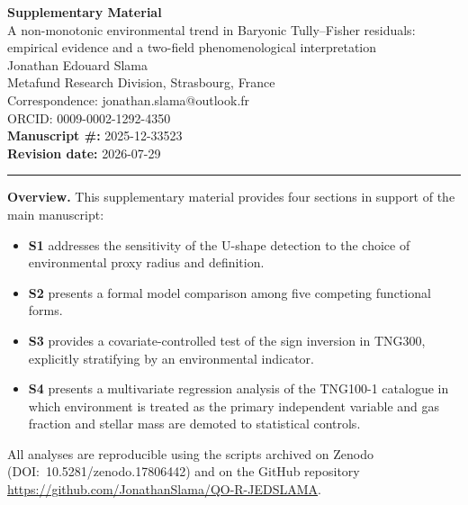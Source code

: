 \documentclass[11pt,a4paper]{article}
\begin{document}
\begin{center}
{\LARGE \textbf{Supplementary Material}}\\[0.3cm]

{\large A non-monotonic environmental trend in Baryonic Tully--Fisher residuals: empirical evidence and a two-field phenomenological interpretation}\\[0.3cm]

{Jonathan Edouard Slama}\\[0.2cm]

{\small Metafund Research Division, Strasbourg, France}\\
{\small Correspondence: jonathan.slama@outlook.fr}\\
{\small ORCID: 0009-0002-1292-4350}\\[0.3cm]

\textbf{Manuscript \#:} 2025-12-33523\\
\textbf{Revision date:} 2026-07-29
\end{center}

\vspace{0.5cm}



\hrule
\vspace{0.5cm}

\textbf{Overview.} This supplementary material provides four sections in
support of the main manuscript:

\begin{itemize}
    \item \textbf{S1} addresses the sensitivity of the U-shape detection
    to the choice of environmental proxy radius and definition.
    \item \textbf{S2} presents a formal model comparison among five
    competing functional forms.
    \item \textbf{S3} provides a covariate-controlled test of the sign
    inversion in TNG300, explicitly stratifying by an environmental
    indicator.
    \item \textbf{S4} presents a multivariate regression analysis of the
    TNG100-1 catalogue in which environment is treated as the primary
    independent variable and gas fraction and stellar mass are demoted to
    statistical controls.
\end{itemize}

All analyses are reproducible using the scripts archived on Zenodo
(DOI:~10.5281/zenodo.17806442) and on the GitHub repository
\url{https://github.com/JonathanSlama/QO-R-JEDSLAMA}.

\newpage


\newpage


\newpage


\newpage


\end{document}
